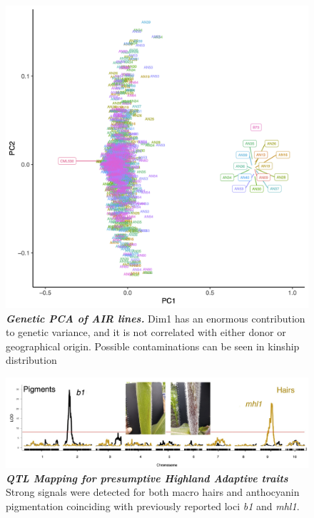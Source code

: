 \begin{figure}[!ht]
\includegraphics[width=0.8\paperwidth]{Chapter-4/figs/genetic_MDS.png}
\caption[Genetic PCA of AIR lines]{\textit{\textbf{Genetic PCA of AIR lines.}}
Dim1 has an enormous contribution to genetic variance, and it is not correlated with either donor or geographical origin. Possible contaminations can be seen in kinship distribution}

\label{Fig3.3}
\end{figure}
\clearpage


\begin{figure}[!ht]
\includegraphics[width=0.8\paperwidth]{Chapter-4/figs/highland_traits.png}
\caption[QTL mapping for presumptive Highland Adaptive traits]{\textit{\textbf{QTL Mapping for presumptive Highland Adaptive traits}} Strong signals were detected for both macro hairs and anthocyanin pigmentation coinciding with previously reported loci \textit{b1} and  \textit{mhl1}.
}
\label{fig:highlandtraits}
\end{figure}


